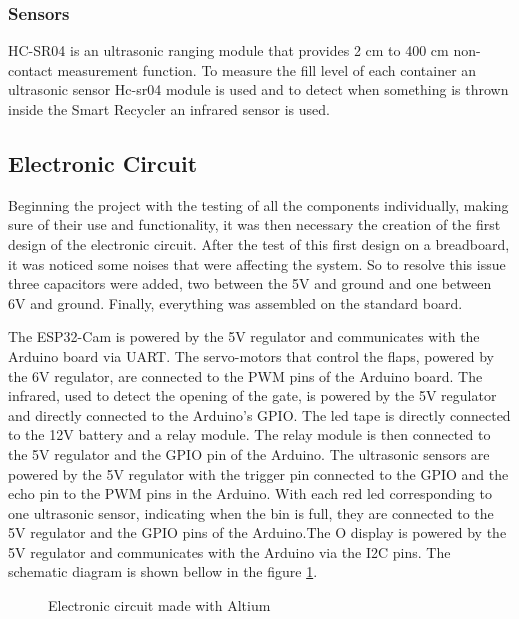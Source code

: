 \documentclass[a4paper,11pt]{article}
\begin{document}
\subsubsection{Sensors}
\label{subsubsec:ultrasonic}
HC-SR04 is an ultrasonic ranging module that provides 2 cm to 400 cm non-contact measurement function\cite{ultrasonic}. To measure the fill level of each container an ultrasonic sensor Hc-sr04 module is used and to detect when something is thrown inside the Smart Recycler an infrared sensor is used.

\subsection{Electronic Circuit}
Beginning the project with the testing of all the components individually, making sure of their use and functionality, it was then necessary the creation of the first design of the electronic circuit. After the test of this first design on a breadboard, it was noticed some noises that were affecting the system. So to resolve this issue three capacitors were added, two between the 5V and ground and one between 6V and ground. Finally, everything was assembled on the standard board.

The ESP32-Cam is powered by the 5V regulator and communicates with the Arduino board via UART. The servo-motors that control the flaps, powered by the 6V regulator, are connected to the PWM pins of the Arduino board. The infrared, used to detect the opening of the gate, is powered by the 5V regulator and directly connected to the Arduino's GPIO. The led tape is directly connected to the 12V battery and a relay module. The relay module is then connected to the 5V regulator and the GPIO pin of the Arduino. The ultrasonic sensors are powered by the 5V regulator with the trigger pin connected to the GPIO and the echo pin to the PWM pins in the Arduino. With each red led corresponding to one ultrasonic sensor, indicating when the bin is full, they are connected to the 5V regulator and the GPIO pins of the Arduino.The O display is powered by the 5V regulator and communicates with the Arduino via the I2C pins. The schematic diagram is shown bellow in the figure \ref{fig:circuit}.
\newpage

\begin{figure}[H]
  \centering
  
  \caption{\small{Electronic circuit made with Altium}}
  \label{fig:circuit}
\end{figure}
\end{document}
